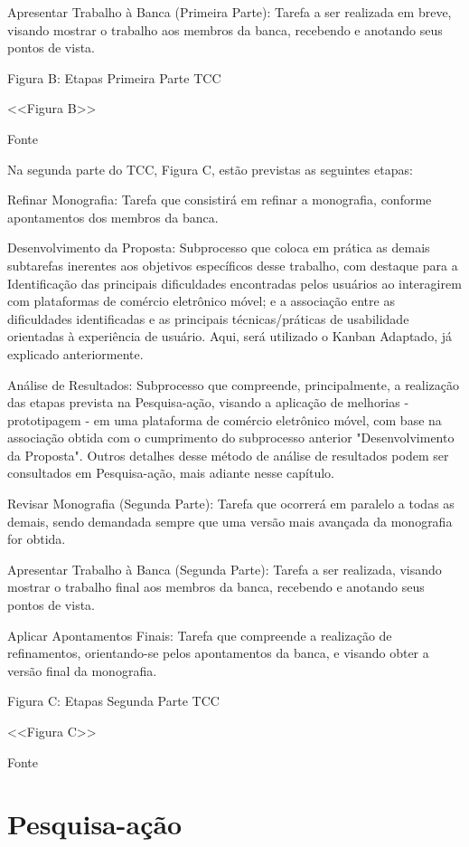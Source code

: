 Apresentar Trabalho à Banca (Primeira Parte): Tarefa a ser realizada em breve, visando mostrar o trabalho aos membros da banca, recebendo e anotando seus pontos de vista.

Figura B: Etapas Primeira Parte TCC

<<Figura B>>

Fonte

Na segunda parte do TCC, Figura C, estão previstas as seguintes etapas:

Refinar Monografia: Tarefa que consistirá em refinar a monografia, conforme apontamentos dos membros da banca.

Desenvolvimento da Proposta: Subprocesso que coloca em prática as demais subtarefas inerentes aos objetivos específicos desse trabalho, com destaque para a Identificação das principais dificuldades encontradas pelos usuários ao interagirem com plataformas de comércio eletrônico móvel; e a associação entre as dificuldades identificadas e as principais técnicas/práticas de usabilidade orientadas à experiência de usuário. Aqui, será utilizado o Kanban Adaptado, já explicado anteriormente.

Análise de Resultados: Subprocesso que compreende, principalmente, a realização das etapas prevista na Pesquisa-ação, visando a aplicação de melhorias - prototipagem - em uma plataforma de comércio eletrônico móvel, com base na associação obtida com o cumprimento do subprocesso anterior "Desenvolvimento da Proposta".  Outros detalhes desse método de análise de resultados podem ser consultados em Pesquisa-ação, mais adiante nesse capítulo.

Revisar Monografia (Segunda Parte): Tarefa que ocorrerá em paralelo a todas as demais, sendo demandada sempre que uma versão mais avançada da monografia for obtida.

Apresentar Trabalho à Banca (Segunda Parte): Tarefa a ser realizada, visando mostrar o trabalho final aos membros da banca, recebendo e anotando seus pontos de vista.

Aplicar Apontamentos Finais: Tarefa que compreende a realização de refinamentos, orientando-se pelos apontamentos da banca, e visando obter a versão final da monografia.

Figura C: Etapas Segunda Parte TCC

<<Figura C>>

Fonte

\section{Pesquisa-ação}

